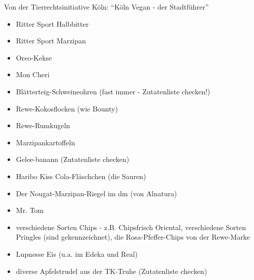 Von der Tierrechtsinitiative Köln: \enquote{Köln Vegan - der Stadtführer}
\begin{itemize}
	\item Ritter Sport Halbbitter
	\item Ritter Sport Marzipan
	\item Oreo-Kekse 
	\item Mon Cheri
	\item Blätterteig-Schweineohren (fast immer - Zutatenliste checken!)
	\item Rewe-Kokosflocken (wie Bounty)
	\item Rewe-Rumkugeln
	\item Marzipankartoffeln
	\item Gelee-banann (Zutatenliste checken)
	\item Haribo Kiss Cola-Fläschchen (die Sauren)
	\item Der Nougat-Marzipan-Riegel im dm (von Alnatura)
	\item Mr. Tom
	\item verschiedene Sorten Chips - z.B. Chipsfrisch Oriental, verschiedene Sorten Pringles (sind gekennzeichnet), die Rosa-Pfeffer-Chips von der Rewe-Marke
	\item Lupnesse Eis (u.a. im Edeka und Real)
	\item diverse Apfelstrudel aus der TK-Truhe (Zutatenliste checken)
\end{itemize}